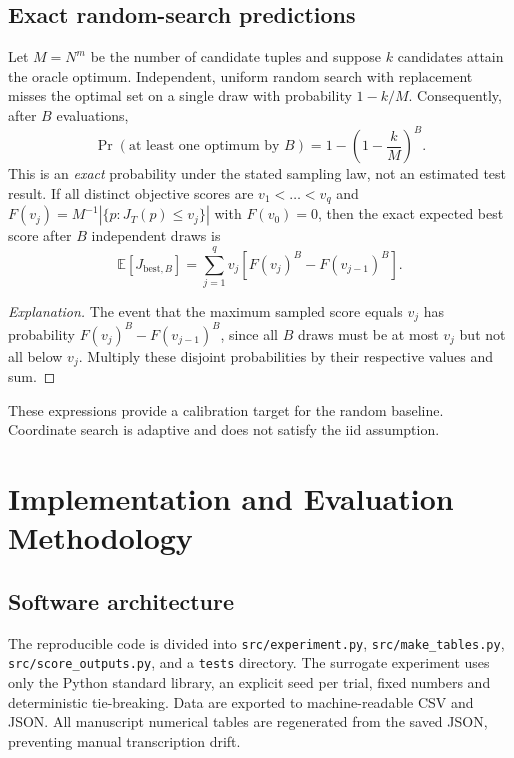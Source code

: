 \documentclass[12pt,a4paper,oneside]{report}
\newcommand{\E}{\mathbb E}
\begin{document}
\section{Exact random-search predictions}
Let $M=N^m$ be the number of candidate tuples and suppose $k$ candidates attain the oracle optimum. Independent, uniform random search with replacement misses the optimal set on a single draw with probability $1-k/M$. Consequently, after $B$ evaluations,
\begin{equation}
\Pr(\text{at least one optimum by }B)=1-\left(1-\frac{k}{M}\right)^B.
\label{eq:success}
\end{equation}
This is an \emph{exact} probability under the stated sampling law, not an estimated test result. If all distinct objective scores are $v_1<\dots<v_q$ and $F(v_j)=M^{-1}|\{p:J_T(p)\le v_j\}|$ with $F(v_0)=0$, then the exact expected best score after $B$ independent draws is
\begin{equation}
\E[J_{\mathrm{best},B}]=\sum_{j=1}^{q}v_j\left[F(v_j)^B-F(v_{j-1})^B\right].
\label{eq:expectedbest}
\end{equation}
\begin{proof}[Explanation]
The event that the maximum sampled score equals $v_j$ has probability $F(v_j)^B-F(v_{j-1})^B$, since all $B$ draws must be at most $v_j$ but not all below $v_j$. Multiply these disjoint probabilities by their respective values and sum.
\end{proof}
These expressions provide a calibration target for the random baseline. Coordinate search is adaptive and does not satisfy the iid assumption.

\chapter{Implementation and Evaluation Methodology}
\section{Software architecture}
The reproducible code is divided into \texttt{src/experiment.py}, \texttt{src/make\_tables.py}, \texttt{src/score\_outputs.py}, and a \texttt{tests} directory. The surrogate experiment uses only the Python standard library, an explicit seed per trial, fixed numbers and deterministic tie-breaking. Data are exported to machine-readable CSV and JSON. All manuscript numerical tables are regenerated from the saved JSON, preventing manual transcription drift.
\end{document}
